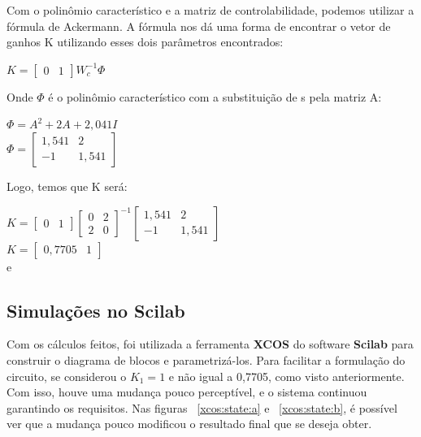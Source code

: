Com o polinômio característico e a matriz de controlabilidade, podemos utilizar a fórmula de Ackermann. A fórmula nos dá uma forma de encontrar o vetor de ganhos K utilizando esses dois parâmetros encontrados:
\begin{center}
    $K = \left[  \begin{array}{cc} 0 & 1 \end{array} \right] W_c^{-1} \Phi$
\end{center}
Onde $\Phi$ é o polinômio característico com a substituição de s pela matriz A:
\begin{center}
    $\Phi = A^2 + 2A + 2,041I$ \vspace{5pt}\\
    $\Phi = \left[  \begin{array}{cc} 1,541 & 2\\ -1 & 1,541 \end{array} \right]$
\end{center}
Logo, temos que K será:
\begin{center}
    $K = \left[  \begin{array}{cc} 0 & 1 \end{array} \right] \left[  \begin{array}{cc} 0 & 2\\ 2 & 0 \end{array} \right]^{-1} \left[  \begin{array}{cc} 1,541 & 2\\ -1 & 1,541 \end{array} \right]$ \vspace{7pt}\\
    $K = \left[  \begin{array}{cc} 0,7705 & 1 \end{array} \right]$ \vspace{5pt}\\
     e 
\end{center}

\subsection{Simulações no Scilab}
Com os cálculos feitos, foi utilizada a ferramenta \textbf{XCOS} do software \textbf{Scilab} para construir o diagrama de blocos e parametrizá-los. 
Para facilitar a formulação do circuito, se considerou o $K_1 = 1$ e não igual a 0,7705, como visto anteriormente. Com isso, houve uma mudança pouco perceptível, e o sistema continuou garantindo os requisitos. Nas figuras ~\ref{xcos:state:a} e ~\ref{xcos:state:b}, é possível ver que a mudança pouco modificou o resultado final que se deseja obter.

